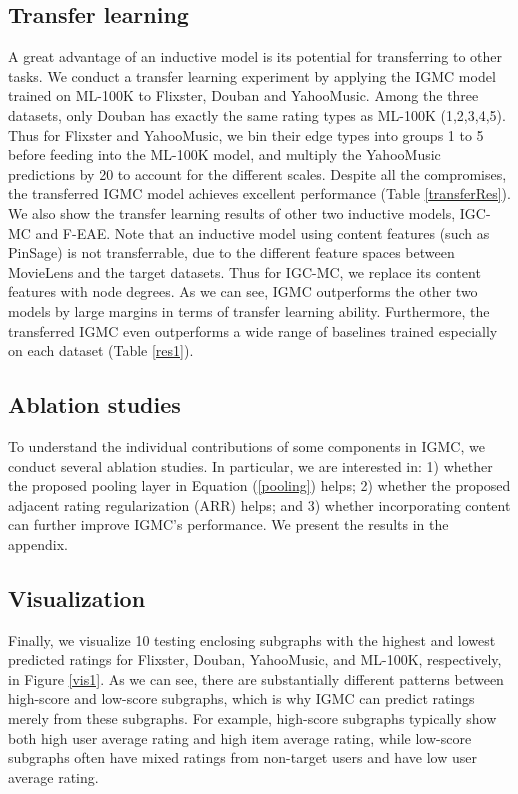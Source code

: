 \documentclass{article} \usepackage{iclr2020_conference,times}
\begin{document}
\subsection{Transfer learning}
A great advantage of an inductive model is its potential for transferring to other tasks. We conduct a transfer learning experiment by applying the IGMC model trained on ML-100K to Flixster, Douban and YahooMusic. Among the three datasets, only Douban has exactly the same rating types as ML-100K (1,2,3,4,5). Thus for Flixster and YahooMusic, we bin their edge types into groups 1 to 5 before feeding into the ML-100K model, and multiply the YahooMusic predictions by 20 to account for the different scales. Despite all the compromises, the transferred IGMC model achieves excellent performance (Table \ref{transferRes}). We also show the transfer learning results of other two inductive models, IGC-MC and F-EAE. Note that an inductive model using content features (such as PinSage) is not transferrable, due to the different feature spaces between MovieLens and the target datasets. Thus for IGC-MC, we replace its content features with node degrees. As we can see, IGMC outperforms the other two models by large margins in terms of transfer learning ability. Furthermore, the transferred IGMC even outperforms a wide range of baselines trained especially on each dataset (Table \ref{res1}). 





\subsection{Ablation studies}
To understand the individual contributions of some components in IGMC, we conduct several ablation studies. In particular, we are interested in: 1) whether the proposed pooling layer in Equation (\ref{pooling}) helps; 2) whether the proposed adjacent rating regularization (ARR) helps; and 3) whether incorporating content can further improve IGMC's performance. We present the results in the appendix.


\subsection{Visualization}
Finally, we visualize 10 testing enclosing subgraphs with the highest and lowest predicted ratings for Flixster, Douban, YahooMusic, and ML-100K, respectively, in Figure \ref{vis1}. As we can see, there are substantially different patterns between high-score and low-score subgraphs, which is why IGMC can predict ratings merely from these subgraphs. For example, high-score subgraphs typically show both high user average rating and high item average rating, while low-score subgraphs often have mixed ratings from non-target users and have low user average rating.
\end{document}
